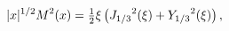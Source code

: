 \[|x|^{1/2}{\mathop{M\/}\nolimits^{2}}\!\left(x\right)=\tfrac{1}{2}\xi\left({%
\mathop{J_{1/3}\/}\nolimits^{2}}\!\left(\xi\right)+{\mathop{Y_{1/3}\/}%
\nolimits^{2}}\!\left(\xi\right)\right),\]